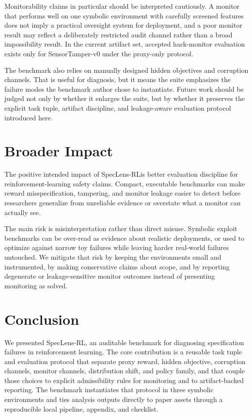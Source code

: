 \documentclass{article}
\newcommand{\framework}{SpecLens-RL}
\begin{document}
Monitorability claims in particular should be interpreted cautiously. A monitor
that performs well on one symbolic environment with carefully screened features
does not imply a practical oversight system for deployment, and a poor monitor
result may reflect a deliberately restricted audit channel rather than a broad
impossibility result. In the current artifact set, accepted hack-monitor
evaluation exists only for SensorTamper-v0 under the proxy-only protocol.

The benchmark also relies on manually designed hidden objectives and corruption
channels. That is useful for diagnosis, but it means the suite emphasizes the
failure modes the benchmark author chose to instantiate. Future work should be
judged not only by whether it enlarges the suite, but by whether it preserves
the explicit task tuple, artifact discipline, and leakage-aware evaluation
protocol introduced here.
\section{Broader Impact}
The positive intended impact of \framework is better evaluation discipline for
reinforcement-learning safety claims. Compact, executable benchmarks can make
reward misspecification, tampering, and monitor leakage easier to detect before
researchers generalize from unreliable evidence or overstate what a monitor can
actually see.

The main risk is misinterpretation rather than direct misuse. Symbolic exploit
benchmarks can be over-read as evidence about realistic deployments, or used to
optimize against narrow toy failures while leaving harder real-world failures
untouched. We mitigate that risk by keeping the environments small and
instrumented, by making conservative claims about scope, and by reporting
degenerate or leakage-sensitive monitor outcomes instead of presenting
monitoring as solved.
\section{Conclusion}
We presented \framework, an auditable benchmark for diagnosing specification
failures in reinforcement learning. The core contribution is a reusable task
tuple and evaluation protocol that separate proxy reward, hidden objective,
corruption channels, monitor channels, distribution shift, and policy family,
and that couple those choices to explicit admissibility rules for monitoring
and to artifact-backed reporting. The benchmark instantiates that protocol in
three symbolic environments and ties analysis outputs directly to paper assets
through a reproducible local pipeline, appendix, and checklist.
\end{document}
